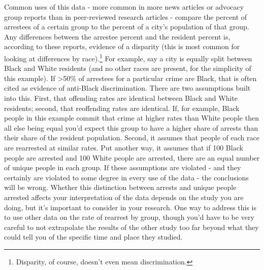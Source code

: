 \documentclass[
  12pt,
  openany]{book}
\begin{document}
Common uses of this data - more common in more news articles or advocacy group reports than in peer-reviewed research articles - compare the percent of arrestees of a certain group to the percent of a city's population of that group. Any differences between the arrestee percent and the resident percent is, according to these reports, evidence of a disparity (this is most common for looking at differences by race).\footnote{Disparity, of course, doesn't even mean discrimination.} For example, say a city is equally split between Black and White residents (and no other races are present, for the simplicity of this example). If \textgreater50\% of arrestees for a particular crime are Black, that is often cited as evidence of anti-Black discrimination. There are two assumptions built into this. First, that offending rates are identical between Black and White residents; second, that reoffending rates are identical. If, for example, Black people in this example commit that crime at higher rates than White people then all else being equal you'd expect this group to have a higher share of arrests than their share of the resident population. Second, it assumes that people of each race are rearrested at similar rates. Put another way, it assumes that if 100 Black people are arrested and 100 White people are arrested, there are an equal number of unique people in each group. If these assumptions are violated - and they certainly are violated to some degree in every use of the data - the conclusions will be wrong. Whether this distinction between arrests and unique people arrested affects your interpretation of the data depends on the study you are doing, but it's important to consider in your research. One way to address this is to use other data on the rate of rearrest by group, though you'd have to be very careful to not extrapolate the results of the other study too far beyond what they could tell you of the specific time and place they studied.
\end{document}
